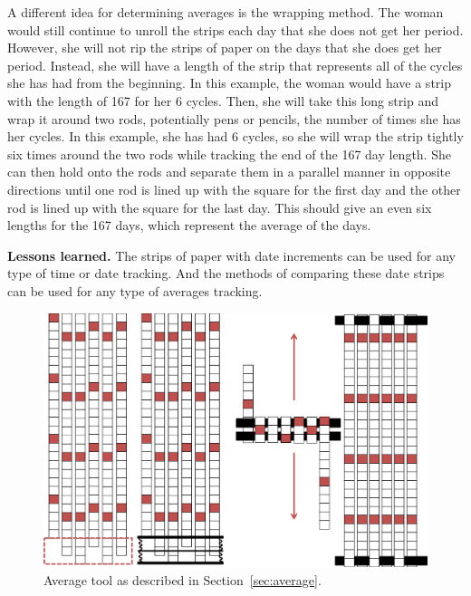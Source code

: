 \documentclass{sig-alternate}
\begin{document}
A different idea for determining averages is the wrapping method. The woman would still continue to unroll the strips each day that she does not get her period. However, she will not rip the strips of paper on the days that she does get her period. Instead, she will have a length of the strip that represents all of the cycles she has had from the beginning. In this example, the woman would have a strip with the length of 167 for her 6 cycles. Then, she will take this long strip and wrap it around two rods, potentially pens or pencils, the number of times she has her cycles. In this example, she has had 6 cycles, so she will wrap the strip tightly six times around the two rods while tracking the end of the 167 day length. She can then hold onto the rods and separate them in a parallel manner in opposite directions until one rod is lined up with the square for the first day and the other rod is lined up with the square for the last day. This should give an even six lengths for the 167 days, which represent the average of the days.

\textbf{Lessons learned.}
The strips of paper with date increments can be used for any type of time or date tracking. And the methods of comparing these date strips can be used for any type of averages tracking. 

\begin{figure}
\centering
\includegraphics[width=\linewidth]{img/average.png}
\caption{Average tool as described in Section~\ref{sec:average}.}
\label{fig:average}
\end{figure}

\end{document}
